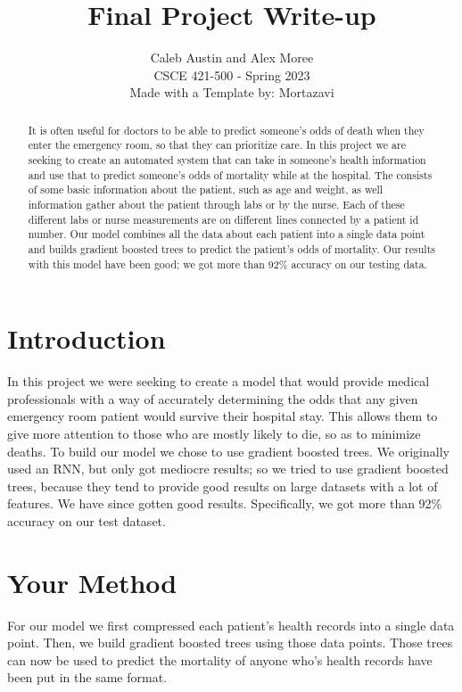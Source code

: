 \documentclass{article}
\title{Final Project Write-up}
\author{%
  Caleb Austin and Alex Moree\\
  CSCE 421-500 - Spring 2023\\
  Made with a Template by: Mortazavi
}
\begin{document}
\maketitle


\begin{abstract}
  It is often useful for doctors to be able to predict someone's odds of death when they enter the emergency room, so that they can prioritize care. In this project we are seeking to create an automated system that can take in someone's health information and use that to predict someone's odds of mortality while at the hospital. The consists of some basic information about the patient, such as age and weight, as well information gather about the patient through labs or by the nurse. Each of these different labs or nurse measurements are on different lines connected by a patient id number. Our model combines all the data about each patient into a single data point and builds gradient boosted trees to predict the patient's odds of mortality. Our results with this model have been good; we got more than 92\% accuracy on our testing data. 
\end{abstract}


\section{Introduction}

In this project we were seeking to create a model that would provide medical professionals with a way of accurately determining the odds that any given emergency room patient would survive their hospital stay. This allows them to give more attention to those who are mostly likely to die, so as to minimize deaths. To build our model we chose to use gradient boosted trees. We originally used an RNN, but only got mediocre results; so we tried to use gradient boosted trees, because they tend to provide good results on large datasets with a lot of features. We have since gotten good results. Specifically, we got more than 92\% accuracy on our test dataset. 

\section{Your Method}

For our model we first compressed each patient's health records into a single data point. Then, we build gradient boosted trees using those data points. Those trees can now be used to predict the mortality of anyone who's health records have been put in the same format. 
\end{document}

